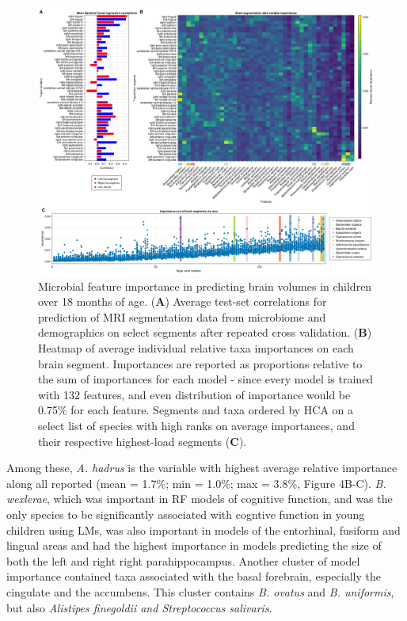 \documentclass{article}
\begin{document}
\begin{figure}
    \centering
    \includegraphics[width=\textwidth]{assets/Figure4.png}
    \caption{
        Microbial feature importance in predicting brain volumes in children over 18 months of age.
        (\textbf{A}) Average test-set correlations for prediction of MRI segmentation
        data from microbiome and demographics on select segments after repeated
        cross validation. (\textbf{B}) Heatmap of average individual relative taxa
        importances on each brain segment. Importances are reported as
        proportions relative to the sum of importances for each model - since
        every model is trained with 132 features, and even distribution of
        importance would be 0.75\% for each feature. Segments and taxa ordered
        by HCA on a select list of species with high ranks on average importances,
        and their respective highest-load segments (\textbf{C}).
    }
    \label{fig:4}
\end{figure}

Among these, \emph{A. hadrus} is the variable with 
highest average relative importance along all reported 
(mean = 1.7\%; min = 1.0\%; max = 3.8\%, Figure 4B-C).
\emph{B. wexlerae}, which was important in RF models of cognitive function,
and was the only species to be significantly associated
with cogntive function in young children using LMs, 
was also important in models of the entorhinal, fusiform and lingual areas
and had the highest importance in models predicting the size of
both the left and right right parahippocampus.
Another cluster of model importance contained taxa associated with the
basal forebrain, especially the cingulate and the accumbens. This
cluster contains \emph{B. ovatus} and \emph{B. uniformis},
but also \emph{Alistipes finegoldii and Streptococcus salivaris}.
\end{document}
